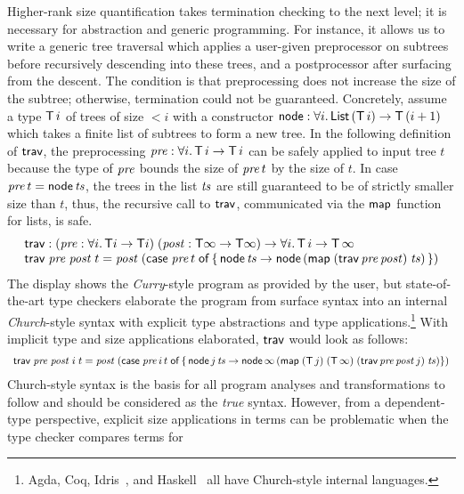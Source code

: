 \documentclass[acmsmall,screen]{acmart}\settopmatter{}
\begin{document}
Higher-rank size quantification takes termination checking to the next
level; it is necessary for abstraction and generic programming.  For
instance, it allows us to write a generic tree traversal which applies
a user-given preprocessor on subtrees before recursively descending
into these trees, and a postprocessor after surfacing from the
descent.
The condition is that preprocessing does not increase the size of the subtree; otherwise, termination could not be guaranteed.  Concretely, assume a type $\mathsf{T}\,i$ of trees of size $< i$ with a constructor $\mathsf{node} : \forall i.\, \mathsf{List}\,(\mathsf{T}\,i) \to \mathsf{T}\,(i+1)$ which takes a finite list of subtrees to form a new tree.
In the following definition of $\mathsf{trav}$, the preprocessing $\mathit{pre} : \forall i.\, \mathsf{T}\,i \to \mathsf{T}\,i$ can be safely applied to input tree $t$ because the type of $\mathit{pre}$ bounds the size of $\mathit{pre}\,t$ by the size of $t$.
In case $\mathit{pre}\,t = \mathsf{node}\,\mathit{ts}$, the trees in the list $\mathit{ts}$ are still guaranteed to be of strictly smaller size than $t$, thus, the recursive call to $\mathsf{trav}$, communicated via the $\mathsf{map}$ function for lists, is safe.
\[
\begin{array}{l}
  \mathsf{trav} : (\mathit{pre} : \forall i.\, \mathsf{T} i \to \mathsf{T} i)\; (\mathit{post} : \mathsf{T} \infty \to \mathsf{T} \infty) \to \forall i.\, \mathsf{T}\,i \to \mathsf{T}\,\infty
  \\
  \mathsf{trav} \; \mathit{pre} \; \mathit{post} \; t = \mathit{post}\;(\mathsf{case}\;\mathit{pre}\,t\;\mathsf{of} \, \{ \, \mathsf{node}\,\mathit{ts} \to \mathsf{node}\,(\mathsf{map} \; (\mathsf{trav} \, \mathit{pre} \, \mathit{post}) \; \mathit{ts})\, \})
\end{array}
\]
The display shows the \emph{Curry}-style program as provided by the user, but state-of-the-art type checkers elaborate the program from surface syntax into an internal \emph{Church}-style syntax with explicit type abstractions and type applications.\footnote{Agda, Coq, Idris~\cite{brady:jfp13}, and Haskell~\cite{sulzmannChakravartyPeythonJonesDonnelly:tldi07} all have Church-style internal languages.}  With implicit type and size applications elaborated, $\mathsf{trav}$ would look as follows:
\[
\begin{array}{l}
  \mathsf{trav} \; \mathit{pre} \; \mathit{post} \; i\; t = \mathit{post}\;(\mathsf{case}\;\mathit{pre}\,i\,t\;\mathsf{of} \, \{ \, \mathsf{node}\,j\,\mathit{ts} \to \mathsf{node}\,\infty\,(\mathsf{map} \; (\mathsf{T}\,j) \; (\mathsf{T}\,\infty) \; (\mathsf{trav} \, \mathit{pre} \, \mathit{post} \, j) \; \mathit{ts}) \})
\end{array}
\]
Church-style syntax is the basis for all program analyses and transformations to follow and should be considered as the \emph{true} syntax.
However, from a dependent-type perspective, explicit size applications
in terms can be problematic when the type checker compares terms for
\end{document}

